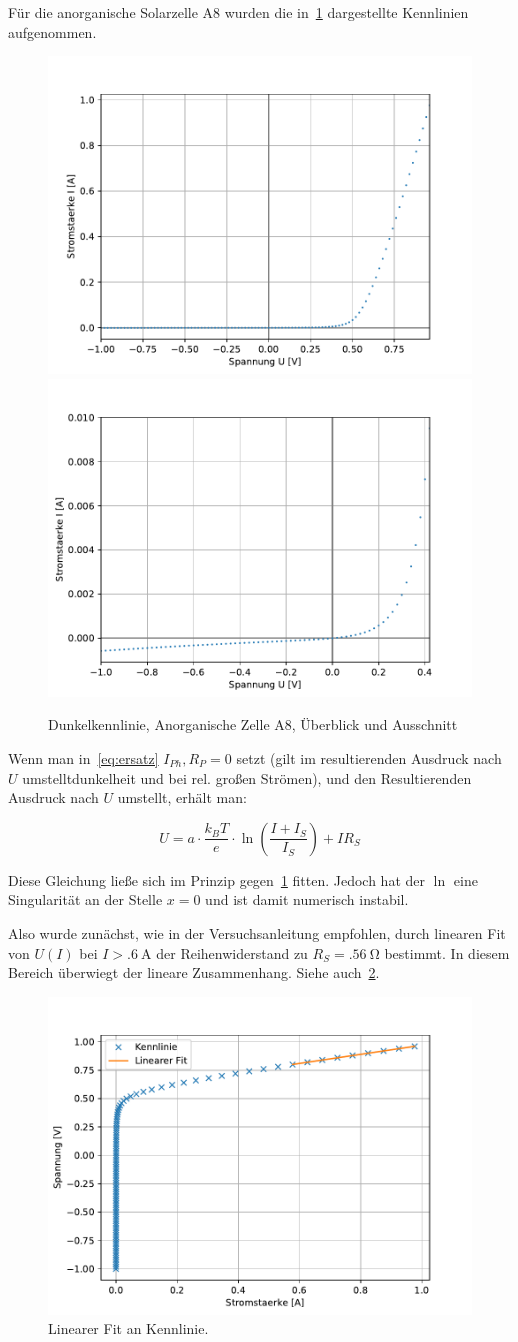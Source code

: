 \documentclass[slug=SZ, room=Hermann-Krone-Bau\,\ Labor\ 1.25, supervisor=Martin\ Kroll]{../../Lab_Report_LaTeX/lab_report}
\begin{document}
F\"ur die anorganische Solarzelle A8 wurden die
in~\ref{fig:a-anorg-dunkel} dargestellte Kennlinien aufgenommen.
\begin{figure}[H]\centering
  \includegraphics[width=.5\columnwidth]{./figs/python/A/an_dark_all.pdf}
  \includegraphics[width=.5\columnwidth]{./figs/python/A/an_dark_close.pdf}
  \caption{Dunkelkennlinie, Anorganische Zelle A8, \"Uberblick und Ausschnitt}
  \label{fig:a-anorg-dunkel}
\end{figure}

Wenn man in~\ref{eq:ersatz} \(I_{Ph}, R_{P}=0\) setzt (gilt im
resultierenden Ausdruck nach \(U\) umstelltdunkelheit und bei
rel. gro\ss{}en Str\"omen), und den Resultierenden Ausdruck nach \(U\)
umstellt, erh\"alt man:

\begin{equation}
  \label{eq:uofi}
  U=a\cdot\frac{k_BT}{e}\cdot\ln(\frac{I+I_S}{I_S})+IR_S
\end{equation}


Diese Gleichung ließe sich im Prinzip gegen~\ref{fig:a-anorg-dunkel}
fitten. Jedoch hat der \(\ln\) eine Singularit\"at an der Stelle
\(x=0\) und ist damit numerisch instabil.

Also wurde zun\"achst, wie in der Versuchsanleitung empfohlen, durch
linearen Fit von \(U(I)\) bei \(I>\SI{.6}{\ampere}\) der
Reihenwiderstand zu \(R_S=\SI{.56}{\ohm}\) bestimmt. In diesem Bereich
\"uberwiegt der lineare Zusammenhang. Siehe
auch~\ref{fig:a-anorg-lin}.

\begin{figure}[H]\centering
  \includegraphics[width=.5\columnwidth]{./figs/python/A/dark_an_lin_fit.pdf}
  \caption{Linearer Fit an Kennlinie.}
  \label{fig:a-anorg-lin}
\end{figure}
\end{document}
